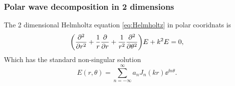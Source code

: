\documentclass[11pt,a4paper, 
swedish,english %
]{article}
\begin{document}
\subsubsection{Polar wave decomposition in 2 dimensions}
The 2 dimensional Helmholtz equation \eqref{eq:Helmholtz} in polar cooridnats is
\begin{equation}
\label{eq:Helmholtz_polar}
\qty(\pdv[2]{r}+\frac{1}{r}\pdv{r}+\frac{1}{r^2}\pdv[2]{\theta})E+k^2E=0,
\end{equation}
%
%
Which has the standard non-singular solution
\begin{equation}
E(r, \theta)=\sum_{n=-\infty}^{\infty} a_nJ_n(kr)\ee^{\ii n \theta}.
\end{equation}
\end{document}
